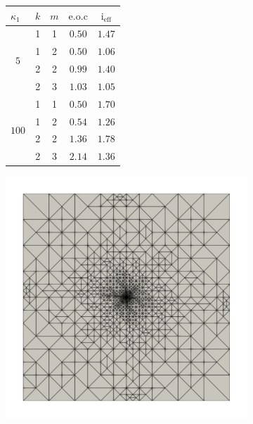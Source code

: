 \begin{figure}
    \centering
    \begin{subfigure}[b]{0.32\textwidth}
        \centering
        \begin{tabular}{@{}c|c c|c|c@{}}
            \toprule
            \multicolumn{1}{l}{$\kappa_1$} & $k$ & $m$ & $\mathrm{e.o.c}$ & $\mathrm{i_{eff}}$ \\ \midrule
            \multirow{4}{*}{$5$}     & 1 & 1 & $0.50$ & $1.47$ \\
                                     & 1 & 2 & $0.50$ & $1.06$ \\
                                     & 2 & 2 & $0.99$ & $1.40$ \\
                                     & 2 & 3 & $1.03$ & $1.05$ \\ \cmidrule(l){1-5} 
            \multirow{4}{*}{$100$}   & 1 & 1 & $0.50$ & $1.70$ \\
                                     & 1 & 2 & $0.54$ & $1.26$ \\
                                     & 2 & 2 & $1.36$ & $1.78$ \\
                                     & 2 & 3 & $2.14$ & $1.36$ \\ \cmidrule(l){1-5} 
        \end{tabular}
        \caption{}
        \label{fig:poisson-riviere_results}
    \end{subfigure}
    \hfill
    \begin{subfigure}[b]{0.32\textwidth}
        \centering
        \includegraphics[width=\textwidth]{Riviere-100_P1_RT2_Mesh.pdf}

\end{subfigure}
\end{figure}
